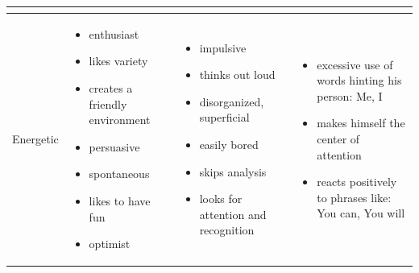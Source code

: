 \begin{table}[h]
\begin{tabular}{p{}p{}p{}p{}}
\begin{itemize}
      \end{itemize}
     \\ \midrule
    Energetic 
     &
      \begin{itemize}
       \item enthusiast
       \item likes variety
       \item creates a friendly environment
       \item persuasive 
       \item spontaneous
       \item likes to have fun
       \item optimist
      \end{itemize}
     &
     \begin{itemize}
      \item impulsive
      \item thinks out loud
      \item disorganized, superficial
      \item easily bored
      \item skips analysis
      \item looks for attention and recognition
     \end{itemize}
     & 
      \begin{itemize}
       \item excessive use of words hinting his person: Me, I 
       \item makes himself the center of attention
       \item reacts positively to phrases like: You can, You will
      \end{itemize}
     \\ \bottomrule
    \end{tabular}
    \label{table:prae}
\end{table}
